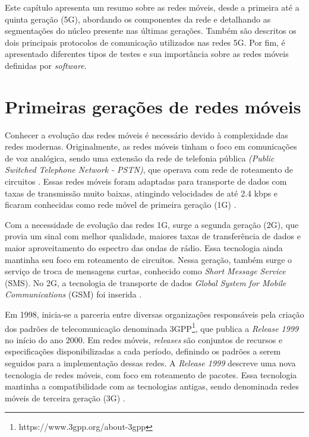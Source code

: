 Este capítulo apresenta um resumo sobre as redes móveis, desde a primeira até a quinta geração (5G), abordando os componentes da rede e detalhando as segmentações do núcleo presente nas últimas gerações. Também são descritos os dois principais protocolos de comunicação utilizados nas redes 5G. Por fim, é apresentado diferentes tipos de testes e sua importância sobre as redes móveis definidas por \textit{software}. 

\section{Primeiras gerações de redes móveis}

Conhecer a evolução das redes móveis é necessário devido à complexidade das redes modernas.
Originalmente, as redes móveis tinham o foco em comunicações de voz analógica, sendo uma extensão da rede de telefonia pública \textit{(Public Switched Telephone Network - PSTN)}, que operava com rede de roteamento de circuitos \cite{Cardoso2020}.
Essas redes móveis foram adaptadas para transporte de dados com taxas de transmissão muito baixas, atingindo velocidades de até 2.4 kbps e ficaram conhecidas como rede móvel de primeira geração (1G) \cite{vora2015evolution}.

Com a necessidade de evolução das redes 1G, surge a segunda geração (2G), que provia um sinal com melhor qualidade, maiores taxas de transferência de dados e maior aproveitamento do espectro das ondas de rádio.
Essa tecnologia ainda mantinha seu foco em roteamento de circuitos.
Nessa geração, também surge o serviço de troca de mensagens curtas, conhecido como \textit{Short Message Service} (SMS).
No 2G, a tecnologia de transporte de dados \textit{Global System for Mobile Communications} (GSM) foi inserida \cite{bhalla2010generations}.

Em 1998, inicia-se a parceria entre diversas organizações responsáveis pela criação dos padrões de telecomunicação denominada 3GPP\footnote{https://www.3gpp.org/about-3gpp}, que publica a \textit{Release 1999} no início do ano 2000.
Em redes móveis, \textit{releases} são conjuntos de recursos e especificações disponibilizadas a cada período, definindo os padrões a serem seguidos para a implementação dessas redes.
A \textit{Release 1999} descreve uma nova tecnologia de redes móveis, com foco em roteamento de pacotes.
Essa tecnologia mantinha a compatibilidade com as tecnologias antigas, sendo denominada redes móveis de terceira geração (3G) \cite{3gpp.01.01}.

